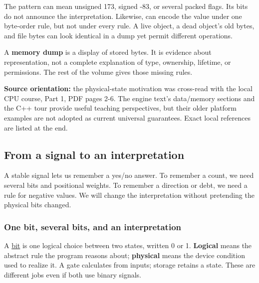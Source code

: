 The pattern  can mean unsigned 173, signed -83, or several packed flags. Its bits do not announce the interpretation. Likewise,  can encode the value  under one byte-order rule, but not under every rule. A live object, a dead object's old bytes, and file bytes can look identical in a dump yet permit different operations.

A \textbf{memory dump} is a display of stored bytes. It is evidence about representation, not a complete explanation of type, ownership, lifetime, or permissions. The rest of the volume gives those missing rules.

\textbf{Source orientation:} the physical-state motivation was cross-read with the local CPU course, Part 1, PDF pages 2-6. The engine text's data/memory sections and the C++ tour provide useful teaching perspectives, but their older platform examples are not adopted as current universal guarantees. Exact local references are listed at the end.

\subsection{From a signal to an interpretation}\label{01-foundations-i-ch001-from-a-signal-to-an-interpretation}

\hypertarget{01-foundations-i-ch001-from-a-signal-to-an-interpretation}{}

A stable signal lets us remember a yes/no answer. To remember a count, we need several bits and positional weights. To remember a direction or debt, we need a rule for negative values. We will change the interpretation without pretending the physical bits changed.

\subsubsection{One bit, several bits, and an interpretation}\label{01-foundations-i-ch001-one-bit-several-bits-and-an-interpretation}

\hypertarget{01-foundations-i-ch001-one-bit-several-bits-and-an-interpretation}{}

A \hyperref[appendix-ddbb69998a2e]{bit} is one logical choice between two states, written 0 or 1. \textbf{Logical} means the abstract rule the program reasons about; \textbf{physical} means the device condition used to realize it. A gate calculates from inputs; storage retains a state. These are different jobs even if both use binary signals.

